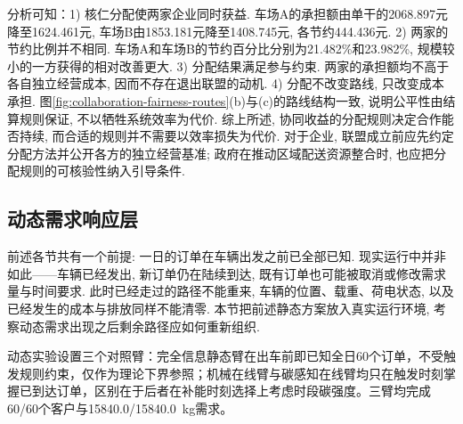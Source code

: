 \documentclass{setp-new}
\begin{document}
分析可知：1) 核仁分配使两家企业同时获益. 车场A的承担额由单干的2068.897元降至1624.461元, 车场B由1853.181元降至1408.745元, 各节约444.436元.
2) 两家的节约比例并不相同. 车场A和车场B的节约百分比分别为21.482\%和23.982\%, 规模较小的一方获得的相对改善更大.
3) 分配结果满足参与约束. 两家的承担额均不高于各自独立经营成本, 因而不存在退出联盟的动机.
4) 分配不改变路线, 只改变成本承担. 图\ref{fig:collaboration-fairness-routes}(b)与(c)的路线结构一致, 说明公平性由结算规则保证, 不以牺牲系统效率为代价.
综上所述, 协同收益的分配规则决定合作能否持续, 而合适的规则并不需要以效率损失为代价. 对于企业, 联盟成立前应先约定分配方法并公开各方的独立经营基准; 政府在推动区域配送资源整合时, 也应把分配规则的可核验性纳入引导条件.

\subsection{动态需求响应层}

前述各节共有一个前提: 一日的订单在车辆出发之前已全部已知.
现实运行中并非如此——车辆已经发出, 新订单仍在陆续到达,
既有订单也可能被取消或修改需求量与时间要求.
此时已经走过的路径不能重来, 车辆的位置、载重、荷电状态,
以及已经发生的成本与排放同样不能清零.
本节把前述静态方案放入真实运行环境, 考察动态需求出现之后剩余路径应如何重新组织.

动态实验设置三个对照臂：完全信息静态臂在出车前即已知全日60个订单，不受触发规则约束，仅作为理论下界参照；机械在线臂与碳感知在线臂均只在触发时刻掌握已到达订单，区别在于后者在补能时刻选择上考虑时段碳强度。三臂均完成60/60个客户与15840.0/15840.0~kg需求。
\end{document}
